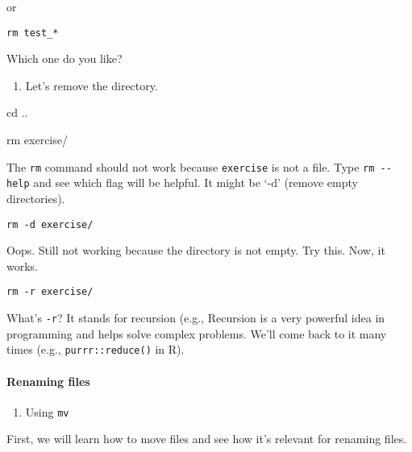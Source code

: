 \documentclass[
]{book}
\newenvironment{Shaded}{\begin{snugshade}}{\end{snugshade}}
\newcommand{\BuiltInTok}[1]{#1}
\newcommand{\FunctionTok}[1]{\textcolor[rgb]{0.00,0.00,0.00}{#1}}
\newcommand{\NormalTok}[1]{#1}
\providecommand{\tightlist}{%
  \setlength{\itemsep}{0pt}\setlength{\parskip}{0pt}}
\begin{document}
or

\begin{verbatim}
rm test_*
\end{verbatim}

Which one do you like?

\begin{enumerate}
\def\labelenumi{\arabic{enumi}.}
\setcounter{enumi}{3}
\tightlist
\item
  Let's remove the directory.
\end{enumerate}

\begin{Shaded}
\begin{Highlighting}[]

\BuiltInTok{cd}\NormalTok{ .. }

\FunctionTok{rm}\NormalTok{ exercise/}
\end{Highlighting}
\end{Shaded}

The \texttt{rm} command should not work because \texttt{exercise} is not a file. Type \texttt{rm\ -\/-help} and see which flag will be helpful. It might be `-d' (remove empty directories).

\begin{verbatim}
rm -d exercise/  
\end{verbatim}

Oops. Still not working because the directory is not empty. Try this. Now, it works.

\begin{verbatim}
rm -r exercise/ 
\end{verbatim}

What's \texttt{-r}? It stands for recursion (e.g., Recursion is a very powerful idea in programming and helps solve complex problems. We'll come back to it many times (e.g., \texttt{purrr::reduce()} in R).

\hypertarget{renaming-files}{%
\paragraph{Renaming files}\label{renaming-files}}

\begin{enumerate}
\def\labelenumi{\arabic{enumi}.}
\tightlist
\item
  Using \texttt{mv}
\end{enumerate}

First, we will learn how to move files and see how it's relevant for renaming files.
\end{document}
